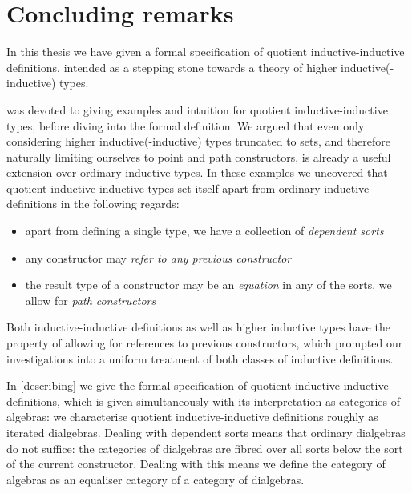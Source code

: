 \chapter{Concluding remarks}
\label{conclusion}

In this thesis we have given a formal specification of quotient
inductive-inductive definitions, intended as a stepping stone towards
a theory of higher inductive(-inductive) types. 

 was devoted to giving examples and intuition for quotient
inductive-inductive types, before diving into the formal
definition. We argued that even only considering higher
inductive(-inductive) types truncated to sets, and therefore naturally
limiting ourselves to point and path constructors, is already a useful
extension over ordinary inductive types. In these examples we
uncovered that quotient inductive-inductive types set itself apart
from ordinary inductive definitions in the following regards:
\begin{itemize}
\item apart from defining a single type, we have a collection of \emph{dependent sorts}
\item any constructor may \emph{refer to any previous constructor}
\item the result type of a constructor may be an \emph{equation} in
  any of the sorts, \ie we allow for \emph{path constructors}
\end{itemize}
Both inductive-inductive definitions as well as higher inductive types
have the property of allowing for references to previous constructors,
which prompted our investigations into a uniform treatment of both
classes of inductive definitions.

In \cref{describing} we give the formal specification of quotient
inductive-inductive definitions, which is given simultaneously with
its interpretation as categories of algebras: we characterise quotient
inductive-inductive definitions roughly as iterated
dialgebras. Dealing with dependent sorts means that ordinary
dialgebras do not suffice: the categories of dialgebras are fibred
over all sorts below the sort of the current constructor. Dealing with
this means we define the category of algebras as an equaliser category
of a category of dialgebras.

